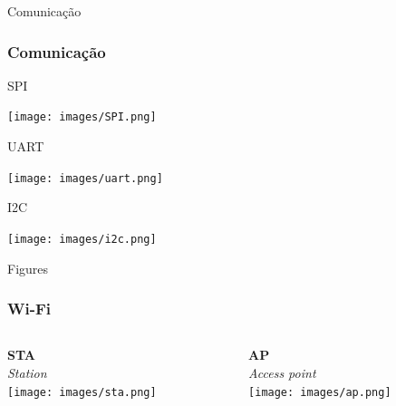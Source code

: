 \documentclass[10pt, compress]{beamer}
\begin{document}
\begin{frame}{Comunicação}
  \frametitle{Comunicação}
  SPI
  \begin{center}
  
  \texttt{[image: images/SPI.png]}\\
 \end{center}
  UART
 \begin{center}
  \texttt{[image: images/uart.png]}\\
 \end{center}
  I2C
 \begin{center}
  \texttt{[image: images/i2c.png]}\\
 \end{center}
\end{frame}

\begin{frame}{Figures}
  \frametitle{Wi-Fi}
  \begin{columns}
    \begin{column}{0.48\textwidth}
      \begin{center}
        \textbf{STA}\\
        \textit{Station}\\
        \vspace{30pt}
        \texttt{[image: images/sta.png]}\\
      \end{center}
    \end{column}
    \begin{column}{0.48\textwidth}
      \begin{center}
        \textbf{AP}\\
        \textit{Access point}\\
        \vspace{30pt}
        \texttt{[image: images/ap.png]}\\
      \end{center}
    \end{column}
  \end{columns}
\end{frame}
\end{document}
